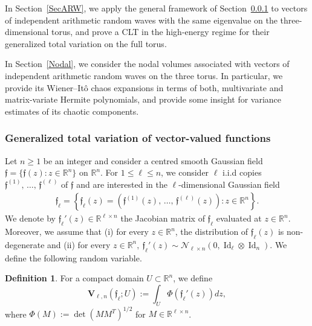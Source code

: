 \documentclass[10pt]{amsart}
\theoremstyle{definition}\newtheorem{defi}[theo]{Definition}\newtheorem{rema}[theo]{Remark}\newtheorem{exam}[theo]{Example}\newtheorem{exem}[theo]{Example}\newtheorem{nota}[theo]{Notation}
\DeclareMathOperator{\Id}{Id}
\newcommand{\scN}{\mathscr{N}}
\newcommand{\bfv}{\mathbf{V}}
\newcommand{\frkf}{\mathfrak{f}}
\newcommand{\R}{\mathbb{R}}
\begin{document}
In Section~\ref{SecARW}, we apply the general framework of Section~\ref{TotalVar} to vectors of independent arithmetic random waves with the same eigenvalue on the three-dimensional torus, and prove a CLT in the high-energy regime for their generalized total variation on the full torus.

In Section~\ref{Nodal}, we consider the nodal volumes associated with vectors of independent arithmetic random waves on the three torus. In particular, we provide its Wiener--Itô chaos expansions in terms of both, multivariate and matrix-variate Hermite polynomials, and provide some insight for variance estimates of its chaotic components.

\subsubsection{Generalized total variation of vector-valued functions}\label{TotalVar}

Let $n\geq 1$ be an integer and consider a centred smooth Gaussian field $\frkf=\{\frkf(z): z\in \R^n\}$ on $\R^n$. For $1\leq \ell \leq n$, we consider $\ell$ i.i.d copies $\frkf^{(1)},\,\ldots, \,\frkf^{(\ell)}$ of $\frkf$ and are interested in the $\ell$-dimensional Gaussian field
\begin{gather*}
\frkf_{\ell}=\left\{\frkf_{\ell}(z)=\left(\frkf^{(1)}(z),\,\ldots,\,\frkf^{(\ell)}(z)\right): z \in \R^n\right\}.
\end{gather*}
We denote by $\frkf_{\ell}'(z) \in \R^{\ell \times n}$ the Jacobian matrix of $\frkf_{\ell}$ evaluated at $z \in \R^n$. Moreover, we assume that (i) for every $z\in \R^n$, the distribution of $\frkf_{\ell}(z)$ is non-degenerate and (ii) for every $z\in \R^n, \ \frkf_{\ell}'(z) \sim \scN_{\ell \times n}(0,\Id_{\ell}\otimes \Id_n)$. We define the following random variable.

\begin{defi}
For a compact domain $U \subset \R^n$, we define
\begin{equation}\label{TOT}
\bfv_{\ell,n}(\frkf_{\ell};U) := \int_{U} \Phi\left(\frkf_{\ell}'(z)\right) dz,
\end{equation}
where $\Phi(M):=\det(MM^T)^{1/2}$ for $M \in \R^{\ell \times n}$.
\end{defi}
\end{document}
